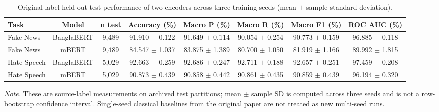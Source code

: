 \begin{table}[t]
\centering
\caption{Original-label held-out test performance of two encoders across three training seeds (mean $\pm$ sample standard deviation).}
\label{tab:main}
\footnotesize
\begin{adjustbox}{max width=\linewidth}
\begin{tabular}{lccccccc}
\toprule
Task & Model & n test & Accuracy (\%) & Macro P (\%) & Macro R (\%) & Macro F1 (\%) & ROC AUC (\%) \\
\midrule
Fake News & BanglaBERT & 9,489 & 91.910 $\pm$ 0.122 & 91.649 $\pm$ 0.114 & 90.054 $\pm$ 0.254 & 90.773 $\pm$ 0.159 & 96.885 $\pm$ 0.118 \\
Fake News & mBERT & 9,489 & 84.547 $\pm$ 1.037 & 83.875 $\pm$ 1.389 & 80.700 $\pm$ 1.050 & 81.919 $\pm$ 1.166 & 89.992 $\pm$ 1.815 \\
Hate Speech & BanglaBERT & 5,029 & 92.663 $\pm$ 0.259 & 92.686 $\pm$ 0.247 & 92.711 $\pm$ 0.188 & 92.657 $\pm$ 0.251 & 97.459 $\pm$ 0.208 \\
Hate Speech & mBERT & 5,029 & 90.873 $\pm$ 0.439 & 90.858 $\pm$ 0.442 & 90.861 $\pm$ 0.435 & 90.859 $\pm$ 0.439 & 96.194 $\pm$ 0.320 \\
\bottomrule
\end{tabular}
\end{adjustbox}
\par\vspace{2pt}
\begin{minipage}{\linewidth}
\scriptsize\emph{Note.} These are source-label measurements on archived test partitions; mean $\pm$ sample SD is computed across three seeds and is not a row-bootstrap confidence interval. Single-seed classical baselines from the original paper are not treated as new multi-seed runs.
\end{minipage}
\end{table}
